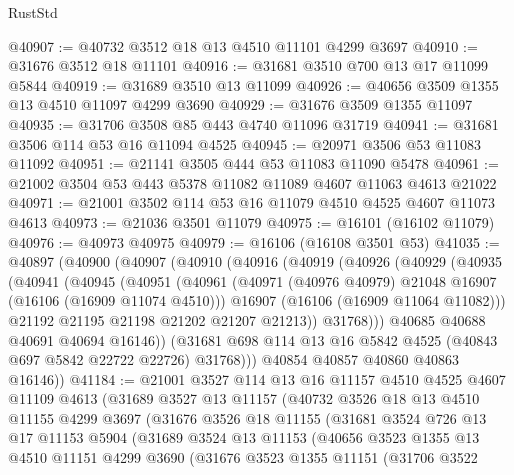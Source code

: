 \begin{lexlean}{RustStd}
\begin{coremodule}
@40907 := @40732 @3512 @18 @13 @4510 @11101 @4299 @3697
@40910 := @31676 @3512 @18 @11101
@40916 := @31681 @3510 @700 @13 @17 @11099 @5844
@40919 := @31689 @3510 @13 @11099
@40926 := @40656 @3509 @1355 @13 @4510 @11097 @4299 @3690
@40929 := @31676 @3509 @1355 @11097
@40935 := @31706 @3508 @85 @443 @4740 @11096 @31719
@40941 := @31681 @3506 @114 @53 @16 @11094 @4525
@40945 := @20971 @3506 @53 @11083 @11092
@40951 := @21141 @3505 @444 @53 @11083 @11090 @5478
@40961 := @21002 @3504 @53 @443 @5378 @11082 @11089 @4607 @11063 @4613 @21022
@40971 := @21001 @3502 @114 @53 @16 @11079 @4510 @4525 @4607 @11073 @4613
@40973 := @21036 @3501 @11079
@40975 := @16101 (@16102 @11079)
@40976 := @40973 @40975
@40979 := @16106 (@16108 @3501 @53)
@41035 := @40897
    (@40900
      (@40907
        (@40910
          (@40916
            (@40919
              (@40926
                (@40929
                  (@40935
                    (@40941
                      (@40945
                        (@40951
                          (@40961
                            (@40971 (@40976 @40979) @21048 @16907 (@16106 (@16909 @11074 @4510)))
                            @16907
                            (@16106 (@16909 @11064 @11082)))
                          @21192
                          @21195
                          @21198
                          @21202
                          @21207
                          @21213))
                      @31768)))
                @40685
                @40688
                @40691
                @40694
                @16146))
            (@31681 @698 @114 @13 @16 @5842 @4525 (@40843 @697 @5842 @22722 @22726) @31768)))
        @40854
        @40857
        @40860
        @40863
        @16146))
@41184 := @21001
    @3527
    @114
    @13
    @16
    @11157
    @4510
    @4525
    @4607
    @11109
    @4613
    (@31689
      @3527
      @13
      @11157
      (@40732
        @3526
        @18
        @13
        @4510
        @11155
        @4299
        @3697
        (@31676
          @3526
          @18
          @11155
          (@31681
            @3524
            @726
            @13
            @17
            @11153
            @5904
            (@31689
              @3524
              @13
              @11153
              (@40656
                @3523
                @1355
                @13
                @4510
                @11151
                @4299
                @3690
                (@31676
                  @3523
                  @1355
                  @11151
                  (@31706
                    @3522

\end{coremodule}
\end{lexlean}
